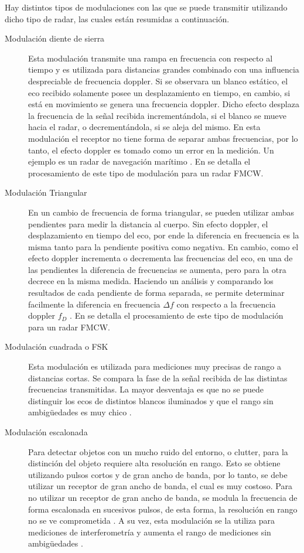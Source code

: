 Hay distintos tipos de modulaciones con las que se puede transmitir utilizando dicho tipo de radar, las cuales están resumidas a continuación.

\begin{description}

\item[Modulación diente de sierra] Esta modulación transmite una rampa en frecuencia con respecto al tiempo y es utilizada para distancias grandes combinado con una influencia despreciable de frecuencia doppler. Si se observara un blanco estático, el eco recibido solamente posee un desplazamiento en tiempo, en cambio, si está en movimiento se genera una frecuencia doppler. Dicho efecto desplaza la frecuencia de la señal recibida incrementándola, si el blanco se mueve hacia el radar, o decrementándola, si se aleja del mismo. En esta modulación el receptor no tiene forma de separar ambas frecuencias, por lo tanto, el efecto doppler es tomado como un error en la medición. Un ejemplo es un radar de navegación marítimo \cite{Basics2015}. En \cite{Shen, Varavin2007a} se detalla el procesamiento de este tipo de modulación para un radar FMCW.

\item[Modulación Triangular] En un cambio de frecuencia de forma triangular, se pueden utilizar ambas pendientes para medir la distancia al cuerpo. Sin efecto doppler, el desplazamiento en tiempo del eco, por ende la diferencia en frecuencia es la misma tanto para la pendiente positiva como negativa. En cambio, como el efecto doppler incrementa o decrementa las frecuencias del eco, en una de las pendientes la diferencia de frecuencias se aumenta, pero para la otra decrece en la misma medida. Haciendo un análisis y comparando los resultados de cada pendiente de forma separada, se permite determinar facilmente la diferencia en frecuencia $\Delta f$ con respecto a la frecuencia doppler $f_D$ \cite{Basics2015}. En \cite{Chang2006, Kurt2007} se detalla el procesamiento de este tipo de modulación para un radar FMCW.

\item[Modulación cuadrada o FSK] Esta modulación es utilizada para mediciones muy precisas de rango a distancias cortas. Se compara la fase de la señal recibida de las distintas frecuencias transmitidas. La mayor desventaja es que no se puede distinguir los ecos de distintos blancos iluminados y que el rango sin ambigüedades es muy chico \cite{Basics2015}.

\item[Modulación escalonada] Para detectar objetos con un mucho ruido del entorno, o clutter, para la distinción del objeto requiere alta resolución en rango. Esto se obtiene utilizando pulsos cortos y de gran ancho de banda, por lo tanto, se debe utilizar un receptor de gran ancho de banda, el cual es muy costoso. Para no utilizar un receptor de gran ancho de banda, se modula la frecuencia de forma escalonada en sucesivos pulsos, de esta forma, la resolución en rango no se ve comprometida \cite{steppedFreq}. A su vez, esta modulación se la utiliza para mediciones de interferometría y aumenta el rango de mediciones sin ambigüedades \cite{Basics2015}.

\end{description}

